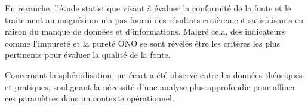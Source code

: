 \documentclass[12pt]{article}
\begin{document}
En revanche, l'étude statistique visant à évaluer la conformité de la 
fonte et le traitement au magnésium n'a pas fourni des résultats 
entièrement satisfaisants en raison du manque de données et d'informations.
Malgré cela, des indicateurs comme l'impureté et la pureté ONO se sont 
révélés être les critères les plus pertinents pour évaluer la qualité de 
la fonte.

Concernant la sphérodisation, un écart a été observé entre les données 
théoriques et pratiques, soulignant la nécessité d'une analyse plus 
approfondie pour affiner ces paramètres dans un contexte opérationnel.

\end{document}
